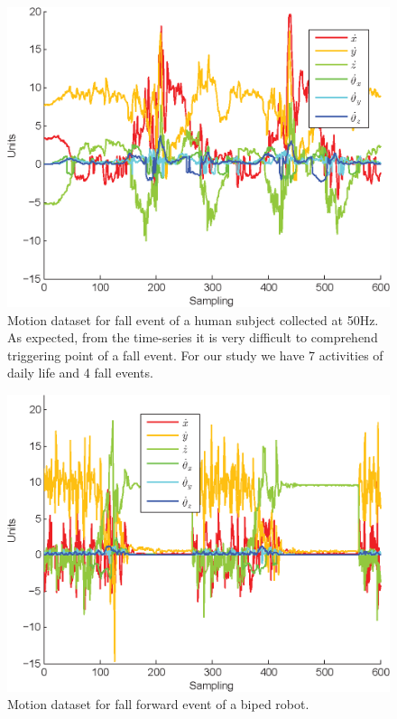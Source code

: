 \documentclass{IEEEtran}
\begin{document}
\begin{figure}[htb]
	\centering
		\includegraphics[width=0.95\columnwidth]{plots/human_falling-crop.eps}
	\caption{Motion dataset for  fall event of a human subject collected at 50Hz. As expected, from the time-series it is very difficult to comprehend triggering point of a fall event. For our study we have 7 activities of daily life and 4 fall events.}
	\label{fig:human_falling-crop}
\end{figure}

\begin{figure}[htb]
	\centering
		\includegraphics[width=0.95\columnwidth]{plots/robot_fallen_forward-crop.eps}
	\caption{Motion dataset for fall forward event of a biped robot.}
	\label{fig:robot_fallen_forward-crop}
\end{figure}
\end{document}
